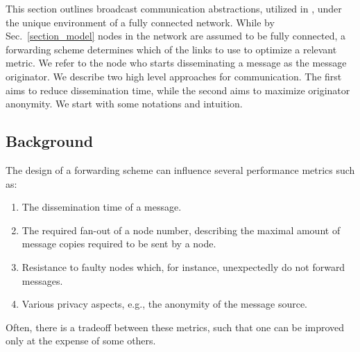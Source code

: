 
This section outlines broadcast communication abstractions, utilized in \nameNS, under the unique environment of a fully connected network. 
While by Sec.~\ref{section_model} nodes in the network are assumed to be fully connected, a forwarding scheme determines which of the links to use to optimize a relevant metric. We refer to the node who starts disseminating a message as the message originator. 
We describe two high level approaches for communication. The first aims to reduce dissemination time, while the second aims to maximize originator anonymity. 
We start with some notations and intuition.






\subsection{Background}
The design of a forwarding scheme can influence several performance metrics such as:

\begin{enumerate}
\item The dissemination time of a message.
\item The required fan-out of a node number, describing the maximal amount of message copies required to be sent by a node.
\item Resistance to faulty nodes which, for instance, unexpectedly do not forward messages.
\item Various privacy aspects, e.g., the anonymity of the message source. 
\end{enumerate}
Often, there is a tradeoff between these metrics, such that one can be improved only at the expense of some others. 



